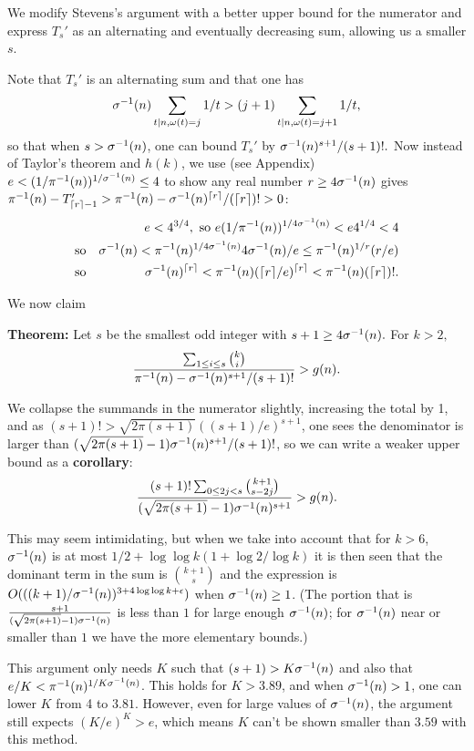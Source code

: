\documentclass[12pt,leqno]{article}
\begin{document}
We modify Stevens's argument with a better upper bound
for the numerator and express $T_s'$ as an alternating
 and eventually decreasing sum, allowing us a smaller $s$. 

Note that $T_s'$ is an alternating sum and that one has
$${\sigma}^{-1}(n) \sum_{t \mid n, \omega(t)=j} 1/t > (j+1) \sum_{t \mid n, \omega(t)=j+1} 1/t,$$
so that when $s > {\sigma}^{-1}(n)$, one can bound $T_s'$ by ${\sigma}^{-1}(n)^{s+1}/(s+1)!.$  Now instead
of Taylor's theorem and $h(k)$, we use (see Appendix)  
 $e < (1/{\pi}^{-1}(n))^{1/{\sigma}^{-1}(n)} \leq 4$ to show any real number $r \geq 4{\sigma}^{-1}(n)$ gives
 ${\pi}^{-1}(n) - T_{\lceil r \rceil -1}' > {\pi}^{-1}(n) - {\sigma}^{-1}(n)^{\lceil r \rceil}/(\lceil r \rceil)! > 0$:
\begin{eqnarray*}
 &  & e < 4^{3/4},\textrm{ so } e(1/{\pi}^{-1}(n))^{1/4{\sigma}^{-1}(n)} < e4^{1/4}< 4\\
 & \textrm{so} & {\sigma}^{-1}(n) < {\pi}^{-1}(n)^{1/4{\sigma}^{-1}(n)}4{\sigma}^{-1}(n)/e \leq {\pi}^{-1}(n)^{1/r}(r/e) \\
 & \textrm{so} & {\sigma}^{-1}(n)^{\lceil r \rceil} < {\pi}^{-1}(n)(\lceil r \rceil/e)^{\lceil r \rceil} < {\pi}^{-1}(n)(\lceil r \rceil)!.
\end{eqnarray*}

We now claim

\textbf{Theorem:} Let $s$ be the smallest odd integer with $s+1 \geq 4{\sigma}^{-1}(n).$ For $k \gt 2,$
$$\frac{\sum_{1 \leq i \leq s} {k \choose i}}{{\pi}^{-1}(n) - {\sigma}^{-1}(n)^{s+1}/(s+1)!} > g(n).$$

We collapse the summands in the numerator slightly, increasing the total by 1, and
as $(s+1)! \gt \sqrt{2\pi(s+1)}((s+1)/e)^{s+1}$, one sees the denominator
is larger than $(\sqrt{2\pi(s+1)} - 1){\sigma}^{-1}(n)^{s+1}/(s+1)!$, so we can write
a weaker upper bound as a \textbf{corollary}:
$$\frac{(s+1)!\sum_{0\leq 2j< s} { k+1 \choose s - 2j }}{(\sqrt{2\pi(s+1)} - 1){\sigma}^{-1}(n)^{s+1}}
> g(n) .$$

This may seem intimidating, but when we take into account that for $k>6$, ${\sigma}^{-1}(n)$ is at most 
$1/2 + \log\log k ( 1 + \log 2/\log k)$
it is then seen that the dominant term in the sum is ${k+1 \choose s}$ and the
expression is $O(((k+1)/{\sigma}^{-1}(n))^{3 + 4\log\log k + \epsilon})$ when ${\sigma}^{-1}(n) \geq 1$.
(The portion that is $\frac{s+1}{(\sqrt{2\pi (s+1)} -1){\sigma}^{-1}(n)}$ is less than $1$ for
large enough ${\sigma}^{-1}(n)$; for ${\sigma}^{-1}(n)$ near or smaller than $1$ we have the more elementary
bounds.)

This argument only needs $K$ such that $(s+1) > K{\sigma}^{-1}(n)$ and also that
$e/K < {\pi}^{-1}(n)^{1/K{\sigma}^{-1}(n)}$.  This holds for $K \gt 3.89$, and when
${\sigma}^{-1}(n) > 1$, one can lower $K$ from 4 to $3.81$.  However, even for large values of ${\sigma}^{-1}(n)$,
the argument still expects $(K/e)^K \gt e$, which means $K$ can't be shown
smaller than $3.59$ with this method.
\end{document}
